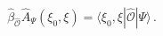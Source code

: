 \begin{equation}
\hat{\beta}_{\hat{\mathcal{O}}}\hat{A}_{\Psi }(\xi _{0},\xi )=\langle \xi
_{0},\xi |{\hat{\mathcal{O}}}|\Psi \rangle \,.
\end{equation}

